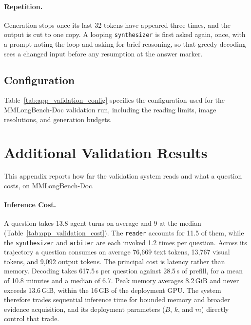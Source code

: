 \paragraph{Repetition.}
Generation stops once its last 32 tokens have appeared three times, and the output is cut to one copy. A looping \texttt{synthesizer} is first asked again, once, with a prompt noting the loop and asking for brief reasoning, so that greedy decoding sees a changed input before any resumption at the answer marker.

\subsection{Configuration}
\label{app:validation_config}

Table~\ref{tab:app_validation_config} specifies the configuration used for the MMLongBench-Doc validation run, including the reading limits, image resolutions, and generation budgets.



\clearpage
\section{Additional Validation Results}
\label{app:validation_results}

This appendix reports how far the validation system reads and what a question costs, on MMLongBench-Doc.



% 

\paragraph{Inference Cost.}
A question takes 13.8 agent turns on average and 9 at the median (Table~\ref{tab:app_validation_cost}). The \texttt{reader} accounts for 11.5 of them, while the \texttt{synthesizer} and \texttt{arbiter} are each invoked 1.2 times per question. Across its trajectory a question consumes on average 76,669 text tokens, 13,767 visual tokens, and 9,092 output tokens. The principal cost is latency rather than memory. Decoding takes 617.5\,s per question against 28.5\,s of prefill, for a mean of 10.8 minutes and a median of 6.7. Peak memory averages 8.2\,GiB and never exceeds 13.6\,GiB, within the 16\,GB of the deployment GPU. The system therefore trades sequential inference time for bounded memory and broader evidence acquisition, and its deployment parameters ($B$, $k$, and $m$) directly control that trade.

